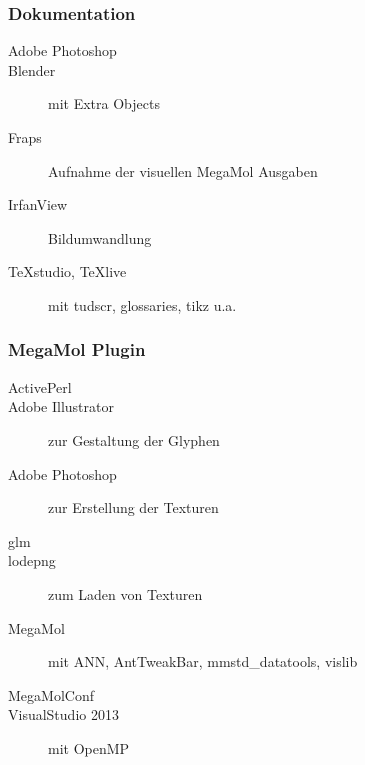 \subsubsection{Dokumentation}
\begin{description}
	\item [Adobe Photoshop]
	\item [Blender] mit Extra Objects
	\item [Fraps] Aufnahme der visuellen MegaMol Ausgaben
	\item [IrfanView] Bildumwandlung
	\item [TeXstudio, TeXlive] mit tudscr, glossaries, tikz u.a.
\end{description}

\subsubsection{MegaMol Plugin}
\begin{description}
	\item [ActivePerl]
	\item [Adobe Illustrator] zur Gestaltung der Glyphen
	\item [Adobe Photoshop] zur Erstellung der Texturen
	\item [glm]
	\item [lodepng] zum Laden von Texturen
	\item [MegaMol] mit ANN, AntTweakBar, mmstd\_datatools, vislib
	\item [MegaMolConf]
	\item [VisualStudio 2013] mit OpenMP
\end{description}


\printbibliography[heading=bibintoc]\label{sec:bibliography}

\printindex %

